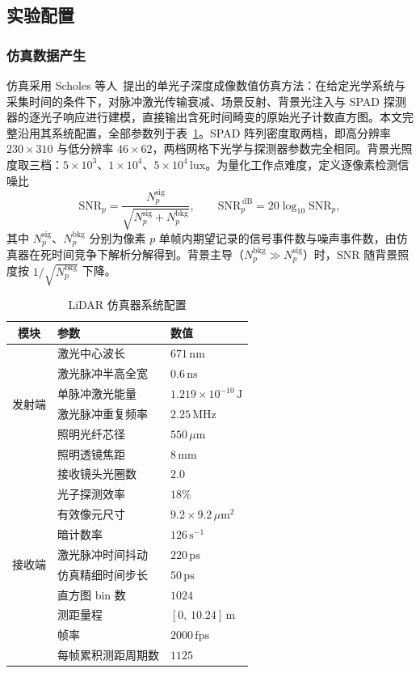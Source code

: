 \subsection{实验配置}
\label{sec:setup}

\subsubsection{仿真数据产生}
仿真采用 Scholes 等人~\cite{Scholes2023}提出的单光子深度成像数值仿真方法：在给定光学系统与采集时间的条件下，对脉冲激光传输衰减、场景反射、背景光注入与 SPAD 探测器的逐光子响应进行建模，直接输出含死时间畸变的原始光子计数直方图。本文完整沿用其系统配置，全部参数列于表~\ref{tab:simcfg}。SPAD 阵列密度取两档，即高分辨率 $230\times310$ 与低分辨率 $46\times62$，两档网格下光学与探测器参数完全相同。背景光照度取三档：$5\times10^{3}$、$1\times10^{4}$、$5\times10^{4}\,\mathrm{lux}$。为量化工作点难度，定义逐像素检测信噪比
\begin{equation}
  \mathrm{SNR}_p=\frac{N^{\mathrm{sig}}_p}{\sqrt{N^{\mathrm{sig}}_p+N^{\mathrm{bkg}}_p}},
  \qquad
  \mathrm{SNR}_p^{\,\mathrm{dB}}=20\log_{10}\mathrm{SNR}_p,
  \label{eq:snr}
\end{equation}
其中 $N^{\mathrm{sig}}_p$、$N^{\mathrm{bkg}}_p$ 分别为像素 $p$ 单帧内期望记录的信号事件数与噪声事件数，由仿真器在死时间竞争下解析分解得到。背景主导（$N^{\mathrm{bkg}}_p\gg N^{\mathrm{sig}}_p$）时，$\mathrm{SNR}$ 随背景照度按 $1/\sqrt{N^{\mathrm{bkg}}_p}$ 下降。

\begin{table}[!t]
\centering
\caption{LiDAR 仿真器系统配置}
\label{tab:simcfg}\small\setlength{\tabcolsep}{15pt}
\begin{tabular}{@{}cll@{}}
\toprule
模块 & 参数 & 数值 \\
\midrule
\multirow{6}{*}{发射端} & 激光中心波长 & $671\,\mathrm{nm}$ \\
 & 激光脉冲半高全宽 & $0.6\,\mathrm{ns}$ \\
 & 单脉冲激光能量 & $1.219\times10^{-10}\,\mathrm{J}$ \\
 & 激光脉冲重复频率 & $2.25\,\mathrm{MHz}$ \\
 & 照明光纤芯径 & $550\,\mu\mathrm{m}$ \\
 & 照明透镜焦距 & $8\,\mathrm{mm}$ \\
\midrule
\multirow{10}{*}{接收端} & 接收镜头光圈数 & $2.0$ \\
 & 光子探测效率 & $18\%$ \\
 & 有效像元尺寸 & $9.2\times9.2\,\mu\mathrm{m}^2$ \\
 & 暗计数率 & $126\,\mathrm{s^{-1}}$ \\
 & 激光脉冲时间抖动 & $220\,\mathrm{ps}$ \\
 & 仿真精细时间步长 & $50\,\mathrm{ps}$ \\
 & 直方图 bin 数 & $1024$ \\
 & 测距量程 & $[0,\,10.24]\,\mathrm{m}$ \\
 & 帧率 & $2000\,\mathrm{fps}$ \\
 & 每帧累积测距周期数 & $1125$ \\
\bottomrule
\end{tabular}
\end{table}

